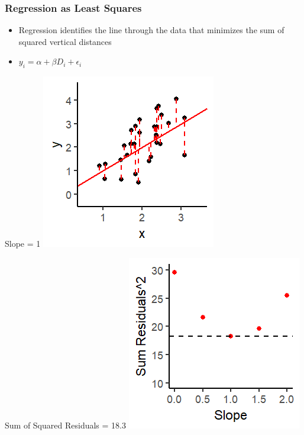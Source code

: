 \documentclass[xcolor=x11names,compress]{beamer}\usepackage[]{graphicx}\usepackage[]{color}
\makeatletter
\def\maxwidth{ %
  \ifdim\Gin@nat@width>\linewidth
    \linewidth
  \else
    \Gin@nat@width
  \fi
}
\newenvironment{knitrout}{}{} %
\renewcommand{\(}{\begin{columns}}
\renewcommand{\)}{\end{columns}}
\newcommand{\<}[1]{\begin{column}{#1}}
\renewcommand{\>}{\end{column}}
\makeatother
\begin{document}
\begin{frame}
\frametitle{Regression as Least Squares}
\begin{itemize}
\item Regression identifies the line through the data that minimizes the sum of squared vertical distances 
\item $y_i = \alpha + \beta D_i + \epsilon_i$
\end{itemize}
\begin{multicols}{2}
Slope = 1
\begin{knitrout}
\color{fgcolor}
\includegraphics[width=\maxwidth]{figure/graph_ols6-1} 

\end{knitrout}
\columnbreak
Sum of Squared Residuals = 18.3
\begin{knitrout}
\color{fgcolor}
\includegraphics[width=\maxwidth]{figure/graph_ssr6-1} 

\end{knitrout}
\end{multicols}
\end{frame}
\end{document}
